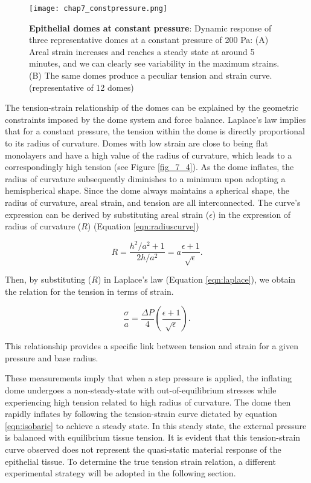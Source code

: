\begin{figure}[b!]
	\centering
	\texttt{[image: chap7\_constpressure.png]}
	\caption{\label{fig_7_3} \textbf{Epithelial domes at constant pressure}: Dynamic response of three representative domes at a constant pressure of 200 Pa: (A) Areal strain increases and reaches a steady state at around 5 minutes, and we can clearly see variability in the maximum strains. (B) The same domes produce a peculiar tension and strain curve. (representative of 12 domes)
	}
\end{figure}

The tension-strain relationship of the domes can be explained by the geometric constraints imposed by the dome system and force balance. Laplace’s law implies that for a constant pressure, the tension within the dome is directly proportional to its radius of curvature. Domes with low strain are close to being flat monolayers and have a high value of the radius of curvature, which leads to a correspondingly high tension  (see Figure \ref{fig_7_4}). As the dome inflates, the radius of curvature subsequently diminishes to a minimum upon adopting a hemispherical shape. Since the dome always maintains a spherical shape, the radius of curvature, areal strain, and tension are all interconnected. The curve's expression can be derived by substituting areal strain ($\epsilon$) in the expression of radius of curvature ($R$) (Equation \ref{eqn:radiuscurve})

\begin{equation}
	R = \frac{h^2/a^2 + 1}{2h/a^2} = a\frac{\epsilon + 1}{\sqrt{\epsilon}}.
\end{equation}

Then, by substituting ($R$) in Laplace's law (Equation \ref{eqn:laplace}), we obtain the relation for the tension in terms of strain.

\begin{equation}
	\label{eqn:isobaric}
	\frac{\sigma}{a} = \frac{\Delta P}{4} \left( \frac{\epsilon + 1}{\sqrt{\epsilon}} \right).
\end{equation}

This relationship provides a specific link between tension and strain for a given pressure and base radius.

These measurements imply that when a step pressure is applied, the inflating dome undergoes a non-steady-state with out-of-equilibrium stresses while experiencing high tension related to high radius of curvature. The dome then rapidly inflates by following the tension-strain curve dictated by equation \ref{eqn:isobaric} to achieve a steady state. In this steady state, the external pressure is balanced with equilibrium tissue tension. It is evident that this tension-strain curve observed does not represent the quasi-static material response of the epithelial tissue. To determine the true tension strain relation, a different experimental strategy will be adopted in the following section.

